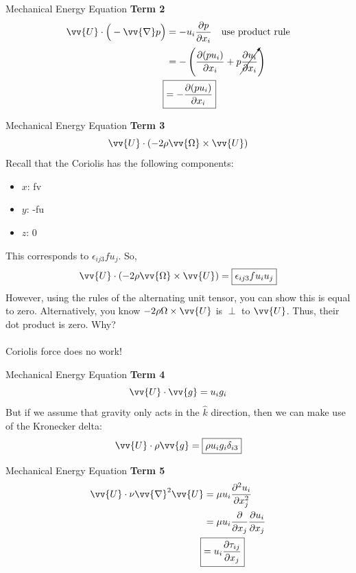 \begin{frame}{Mechanical Energy Equation}
\textbf{Term 2}
\begin{align*}
	\vv{U} \cdot \Big(-\vv{\nabla}p\Big) &= -u_i\frac{\partial p}{\partial x_i}\quad \text{use product rule}\\
	&=-\left(\frac{\partial (pu_i)}{\partial x_i} + p\cancelto{}{\frac{\partial u_i}{\partial x_i}}\right)\\
	\Aboxed{&=-\frac{\partial (pu_i)}{\partial x_i}}
\end{align*}
\end{frame}
\begin{frame}{Mechanical Energy Equation}
\textbf{Term 3}
$$\vv{U} \cdot \left(-2 \rho\vv{\Omega} \times \vv{U} \right)$$
Recall that the Coriolis has the following components:
\begin{itemize}
	\item $x$: fv
	\item $y$: -fu
	\item $z$: 0
\end{itemize}
This corresponds to $\epsilon_{ij3}fu_j$. So,
$$\vv{U} \cdot \left(-2\rho \vv{\Omega} \times \vv{U} \right) = \boxed{\epsilon_{ij3}fu_iu_j}$$
However, using the rules of the alternating unit tensor, you can show this is equal to zero. Alternatively, you know $-2\rho\Omega\times \vv{U}$ is $\perp$ to $\vv{U}$. Thus, their dot product is zero. Why? 
~\\~\\
Coriolis force does no work!
\end{frame}
\begin{frame}{Mechanical Energy Equation}
\textbf{Term 4}
$$\vv{U} \cdot \vv{g} = u_i g_i$$
But if we assume that gravity only acts in the $\hat k$ direction, then we can make use of the Kronecker delta:
$$\vv{U} \cdot \rho \vv{g}=  \boxed{\rho u_i g_i \delta_{i3}}$$
\end{frame}
\begin{frame}{Mechanical Energy Equation}
\textbf{Term 5}
\begin{align*}
\vv{U} \cdot \nu \vv{\nabla}^2\vv{U} &= \mu u_i \frac{\partial^2u_i}{\partial x_j^2}\\
&= \mu u_i \frac{\partial}{\partial x_j}\frac{\partial u_i}{\partial x_j}\\
\Aboxed{&= u_i\frac{\partial \tau_{ij}}{\partial x_j}}
\end{align*}
\end{frame}
